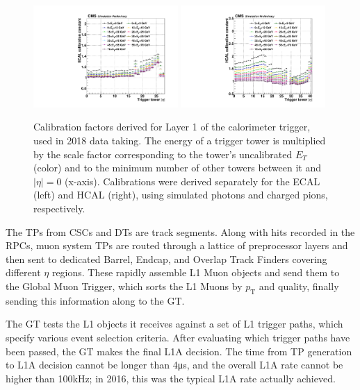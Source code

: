 \begin{figure}[hbtb]
  \begin{center}
    \includegraphics[width=0.49\textwidth]{Figures/photon_SF_3x3.pdf}
    \includegraphics[width=0.49\textwidth]{Figures/picharged_SF_5x5.pdf}
    \caption{Calibration factors derived for Layer 1 of the calorimeter trigger, used in 2018 data taking. The energy of a trigger tower is multiplied
    by the scale factor corresponding to the tower's uncalibrated $E_{T}$ (color) and to the minimum number of other towers between it and $|\eta| = 0$ (x-axis).
    Calibrations were derived separately for the ECAL (left) and HCAL (right), using simulated photons and charged pions, respectively.}
    \label{fig:layer1_calibs}
  \end{center}
\end{figure}

The TPs from CSCs and DTs are track segments. Along with hits recorded in the RPCs, muon system TPs are routed through a lattice of preprocessor
layers and then sent to dedicated Barrel, Endcap, and Overlap Track Finders covering different $\eta$ regions.
These rapidly assemble L1 Muon objects and send them to the Global Muon Trigger,
which sorts the L1 Muons by $p_\mathrm{T}$ and quality, finally sending this information along to the GT.

The GT tests the L1 objects it receives against a set of L1 trigger paths, which specify various event selection criteria. After evaluating
which trigger paths have been passed, the GT makes the final L1A decision. The time from TP generation to L1A decision cannot be longer than
4\unit{\micro s}, and the overall L1A rate cannot be higher than 100\unit{kHz}; in 2016, this was the typical L1A rate actually achieved.

